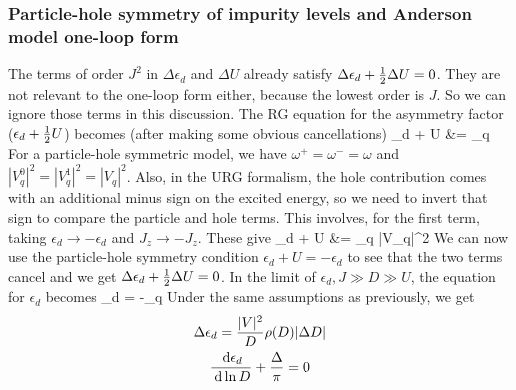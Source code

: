 \documentclass[14pt]{extarticle}
\numberwithin{equation}{section}
\begin{document}
{\subsubsection{Particle-hole symmetry of impurity levels and Anderson model one-loop form}
The terms of order \(J^2\) in \(\Delta \epsilon_d\) and \(\Delta U\) already satisfy \(\Delta \epsilon_d + \frac{1}{2} \Delta U = 0\). They are not relevant to the one-loop form either, because the lowest order is \(J\). So we can ignore those terms in this discussion. The RG equation for the asymmetry factor (\(\epsilon_d + \frac{1}{2} U\)) becomes (after making some obvious cancellations)
\beq
\Delta \epsilon_d + \hf \Delta U &= \sum_q 
\eeq
For a particle-hole symmetric model, we have \(\omega^+ = \omega^- = \omega\) and \(|V_q^0|^2 = |V_q^1|^2 = |V_q|^2\). Also, in the URG formalism, the hole contribution comes with an additional minus sign on the excited energy, so we need to invert that sign to compare the particle and hole terms. This involves, for the first term, taking \(\epsilon_d \to -\epsilon_d\) and \(J_z \to -J_z\). These give
\beq
\Delta \epsilon_d + \hf \Delta U &= \sum_q |V_q|^2 
\eeq
We can now use the particle-hole symmetry condition \(\epsilon_d +  U = -\epsilon_d\) to see that the two terms cancel and we get \(\Delta \epsilon_d + \frac{1}{2} \Delta U =0\).
\pb
In the limit of \(\epsilon_d, J \gg D \gg U \), the equation for \(\epsilon_d\) becomes
\beq
\Delta \epsilon_d = -\sum_q 
\eeq
Under the same assumptions as previously, we get
\begin{gather*}
\Delta \epsilon_d = \frac{|V|^2 }{D}\rho(D) |\Delta D|\\
\frac{\:\mathrm{d}\epsilon_d}{\:\mathrm{d}\ln D} + \frac{\Delta}{\pi} = 0 
\end{gather*}
}
\end{document}
